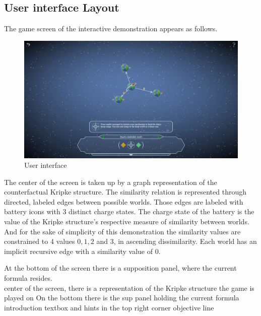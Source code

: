 \documentclass[a4paper,american,10pt]{paper}
\theoremstyle{definition}\newtheorem{definition}{Definition}
\begin{document}
\subsection{User interface Layout}
The game screen of the interactive demonstration appears as follows.
\begin{figure}[H]
\centering
\includegraphics[width=\textwidth]{UI_Layout}
\caption{User interface}
\end{figure}
The center of the screen is taken up by a graph representation of the counterfactual Kripke structure. The similarity relation is represented through directed, labeled edges between possible worlds. Those edges are labeled with battery icons with 3 distinct charge states. The charge state of the battery is the value of the Kripke structure's respective measure of similarity between worlds. And for the sake of simplicity of this demonstration the similarity values are constrained to 4 values $0,1,2$ and $3$, in ascending dissimilarity. Each world has an implicit recursive edge with a similarity value of 0.

At the bottom of the screen there is a supposition panel, where the current formula resides.\\
center of the screen, there is a representation of the Kripke structure the game is played on
On the bottom there is the sup panel holding the current formula
introduction textbox and hints in the top right corner
objective line
\end{document}

